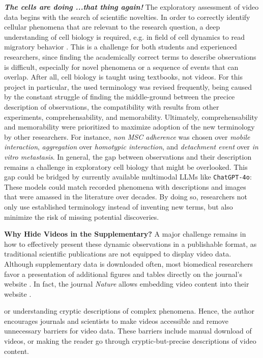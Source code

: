 \textbf{\textit{The cells are doing ...that thing again!}} The exploratory
assessment of video data begins with the search of scientific novelties. In
order to correctly identify cellular phenomena that are relevant to the research
question, a deep understanding of cell biology is required, e.g. in field of
cell dynamics to read migratory behavior
\cite{nalbantExploratoryCellDynamics2018}. This is a challenge for both students
and experienced researchers, since finding the academically correct terms to
describe observations is difficult, especially for novel phenomena or a sequence
of events that can overlap. After all, cell biology is taught using textbooks,
not videos. For this project in particular, the used terminology was revised
frequently, being caused by the constant struggle of finding the middle-ground
between the precice description of observations, the compatibility with results
from other experiments, comprehensability, and memorability. Ultimately,
comprehensability and memorability were prioritized to maximize adoption of the
new terminology by other researchers. For instance, \emph{non MSC adherence} was
chosen over \emph{mobile interaction}, \emph{aggregation} over
\emph{homotypic interaction}, and \emph{detachment event} over \emph{in vitro
    metastasis}. In general, the gap between observations and their description
remains a challenge in exploratory cell biology that might be overlooked. This
gap could be bridged by currently available multimodal \acp{LLM} like
\texttt{ChatGPT-4o}: These models could match recorded phenomena with
descriptions and images that were amassed in the literature over decades. By
doing so, researchers not only use established terminology instead of inventing
new terms, but also minimize the risk of missing potential discoveries.

\textbf{Why Hide Videos in the Supplementary?} A major challenge remains in how
to effectively present these dynamic observations in a publishable format, as
traditional scientific publications are not equipped to display video data.
Although supplementary data is downloaded often, most biomedical researchers
favor a presentation of additional figures and tables directly on the journal's
website \cite{priceRoleSupplementaryMaterial2018}. In fact, the journal
\emph{Nature} allows embedding video content into their website
\cite{NatureVideoContent}. 



or understanding cryptic
descriptions of complex phenomena. Hence, the author encourages journals and
scientists to make videos accessible and remove unnecessary barriers for video
data. These barriers include manual download of videos, or making the reader
go through cryptic-but-precise descriptions of video content. 

